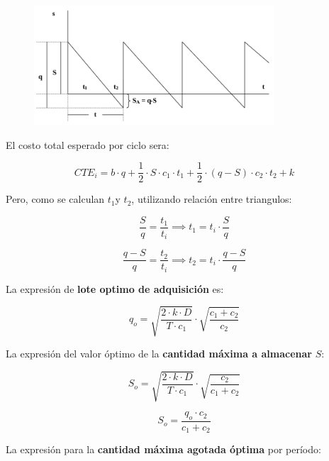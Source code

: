 \documentclass{article}
\begin{document}
\begin{figure}[h!]
    \includegraphics[width=0.8\textwidth]{imagenes/stock-modelo-agotamiento.png}
\end{figure}

El costo total esperado por ciclo sera:

\begin{equation}
    CTE_i= b \cdot q + \frac{1}{2} \cdot S \cdot c_1 \cdot t_1 + \frac{1}{2} \cdot (q - S) \cdot c_2 \cdot t_2 + k
\end{equation}

Pero, como se calculan \(t_1\)y \(t_2\), utilizando relación entre triangulos:

\begin{equation}
    \frac{S}{q} = \frac{t_1}{t_i}  \implies t_1 = t_i \cdot \frac{S}{q}
\end{equation}

\begin{equation}
    \frac{q-S}{q} = \frac{t_2}{t_i}  \implies t_2 = t_i \cdot \frac{q-S}{q}
\end{equation}

La expresión de \textbf{lote optimo de adquisición} es:

\begin{equation}
    q_o = \sqrt{\frac{2 \cdot k \cdot D}{T \cdot c_1}} \cdot \sqrt{\frac{c_1+c_2}{c_2}}
\end{equation}

La expresión del valor óptimo de la \textbf{cantidad máxima a almacenar} \(S\):

\begin{equation}
    S_o = \sqrt{\frac{2 \cdot k \cdot D}{T \cdot c_1}} \cdot \sqrt{\frac{c_2}{c_1+c_2}}
\end{equation}

\begin{equation}
    S_o = \frac{q_o \cdot c_2}{c_1 + c_2}
\end{equation}

La expresión para la \textbf{cantidad máxima agotada óptima} por período:
\end{document}
